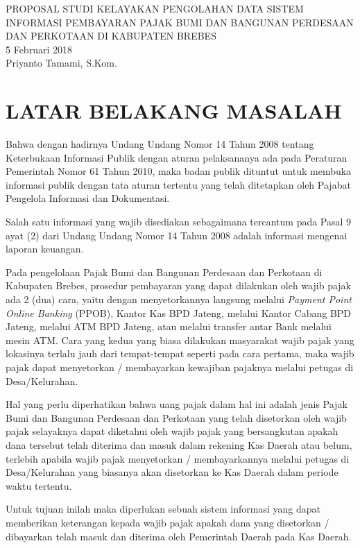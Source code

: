 \documentclass[pdftex,12pt, oneside]{article}
\begin{document}
%
\begin{center}
{\large PROPOSAL STUDI KELAYAKAN PENGOLAHAN DATA SISTEM INFORMASI PEMBAYARAN PAJAK BUMI DAN BANGUNAN PERDESAAN DAN PERKOTAAN DI KABUPATEN BREBES}
\\[1cm]
5 Februari 2018\\
Priyanto Tamami, S.Kom.
\end{center}

\section{LATAR BELAKANG MASALAH}

Bahwa dengan hadirnya Undang Undang Nomor 14 Tahun 2008 tentang Keterbukaan Informasi Publik dengan aturan pelaksananya ada pada Peraturan Pemerintah Nomor 61 Tahun 2010, maka badan publik dituntut untuk membuka informasi publik dengan tata aturan tertentu yang telah ditetapkan oleh Pajabat Pengelola Informasi dan Dokumentasi.

Salah satu informasi yang wajib disediakan sebagaimana tercantum pada Pasal 9 ayat (2) dari Undang Undang Nomor 14 Tahun 2008 adalah informasi mengenai laporan keuangan.

Pada pengelolaan Pajak Bumi dan Bangunan Perdesaan dan Perkotaan di Kabupaten Brebes, prosedur pembayaran yang dapat dilakukan oleh wajib pajak ada 2 (dua) cara, yaitu dengan menyetorkannya langsung melalui \textit{Payment Point Online Banking} (PPOB), Kantor Kas BPD Jateng, melalui Kantor Cabang BPD Jateng, melalui ATM BPD Jateng, atau melalui transfer antar Bank melalui mesin ATM. Cara yang kedua yang biasa dilakukan masyarakat wajib pajak yang lokasinya terlalu jauh dari tempat-tempat seperti pada cara pertama, maka wajib pajak dapat menyetorkan / membayarkan kewajiban pajaknya melalui petugas di Desa/Kelurahan.

Hal yang perlu diperhatikan bahwa uang pajak dalam hal ini adalah jenis Pajak Bumi dan Bangunan Perdesaan dan Perkotaan yang telah disetorkan oleh wajib pajak selayaknya dapat diketahui oleh wajib pajak yang bersangkutan apakah dana tersebut telah diterima dan masuk dalam rekening Kas Daerah atau belum, terlebih apabila wajib pajak menyetorkan / membayarkannya melalui petugas di Desa/Kelurahan yang biasanya akan disetorkan ke Kas Daerah dalam periode waktu tertentu.

Untuk tujuan inilah maka diperlukan sebuah sistem informasi yang dapat memberikan keterangan kepada wajib pajak apakah dana yang disetorkan / dibayarkan telah masuk dan diterima oleh Pemerintah Daerah pada Kas Daerah.
\end{document}
